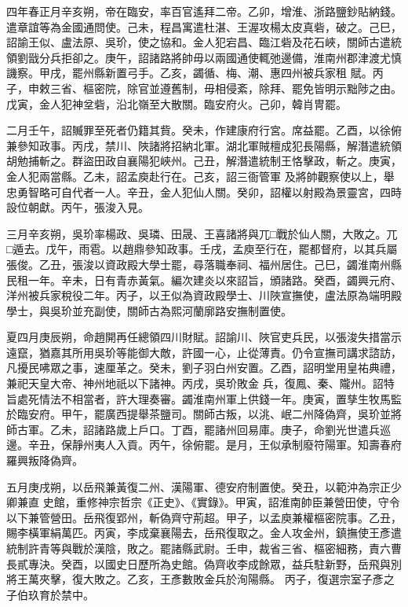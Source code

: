 \begin{pinyinscope}
 四年春正月辛亥朔，帝在臨安，率百官遙拜二帝。乙卯，增淮、浙路鹽鈔貼納錢。遣章誼等為金國通問使。己未，程昌寓遣杜湛、王渥攻楊太皮真砦，破之。己巳，詔諭王似、盧法原、吳玠，使之協和。金人犯宕昌、臨江砦及花石峽，關師古遣統領劉戩分兵拒卻之。庚午，詔諸路將帥毋以兩國通使輒弛邊備，淮南州郡津渡尤慎譏察。甲戌，罷州縣新置弓手。乙亥，蠲循、梅、潮、惠四州被兵家租
 賦。丙子，申敕三省、樞密院，除官並遵舊制，毋相侵紊，除拜、罷免皆明示黜陟之由。戊寅，金人犯神坌砦，沿北嶺至大散關。臨安府火。己卯，韓肖冑罷。



 二月壬午，詔贓罪至死者仍籍其貲。癸未，作建康府行宮。席益罷。乙酉，以徐俯兼參知政事。丙戌，禁川、陜諸將招納北軍。湖北軍賊檀成犯長陽縣，解潛遣統領胡勉捕斬之。群盜田政自襄陽犯峽州。己丑，解潛遣統制王恪擊政，斬之。庚寅，金人犯兩當縣。乙未，詔孟庾赴行在。己亥，詔三衙管軍
 及將帥觀察使以上，舉忠勇智略可自代者一人。辛丑，金人犯仙人關。癸卯，詔權以射殿為景靈宮，四時設位朝獻。丙午，張浚入見。



 三月辛亥朔，吳玠率楊政、吳璘、田晟、王喜諸將與兀□戰於仙人關，大敗之。兀□遁去。戊午，雨雹。以趙鼎參知政事。壬戌，孟庾至行在，罷都督府，以其兵屬張俊。乙丑，張浚以資政殿大學士罷，尋落職奉祠、福州居住。己巳，蠲淮南州縣民租一年。辛未，日有青赤黃氣。編次建炎以來詔旨，頒諸路。癸酉，蠲興元府、
 洋州被兵家稅役二年。丙子，以王似為資政殿學士、川陜宣撫使，盧法原為端明殿學士，與吳玠並充副使，關師古為熙河蘭廓路安撫制置使。



 夏四月庚辰朔，命趙開再任總領四川財賦。詔諭川、陜官吏兵民，以張浚失措當示遠竄，猶嘉其所用吳玠等能御大敵，許國一心，止從薄責。仍令宣撫司講求諮訪，凡擾民咈眾之事，速厘革之。癸未，劉子羽白州安置。乙酉，詔明堂用皇祐典禮，兼祀天皇大帝、神州地祇以下諸神。丙戌，吳玠敗金
 兵，復鳳、秦、隴州。詔特旨處死情法不相當者，許大理奏審。蠲淮南州軍上供錢一年。庚寅，置孳生牧馬監於臨安府。甲午，罷廣西提舉茶鹽司。關師古叛，以洮、岷二州降偽齊，吳玠並將師古軍。乙未，詔諸路歲上戶口。丁酉，罷諸州回易庫。庚子，命劉光世遣兵巡邊。辛丑，保靜州夷人入貢。丙午，徐俯罷。是月，王似承制廢符陽軍。知壽春府羅興叛降偽齊。



 五月庚戌朔，以岳飛兼黃復二州、漢陽軍、德安府制置使。癸丑，以範沖為宗正少卿兼直
 史館，重修神宗哲宗《正史》、《實錄》。甲寅，詔淮南帥臣兼營田使，守令以下兼管營田。岳飛復郢州，斬偽齊守荊超。甲子，以孟庾兼權樞密院事。乙丑，賜李橫軍絹萬匹。丙寅，李成棄襄陽去，岳飛復取之。金人攻金州，鎮撫使王彥遣統制許青等與戰於漢陰，敗之。罷諸縣武尉。壬申，裁省三省、樞密細務，責六曹長貳專決。癸酉，以國史日歷所為史館。偽齊收李成餘眾，益兵駐新野，岳飛與別將王萬夾擊，復大敗之。乙亥，王彥數敗金兵於洵陽縣。
 丙子，復選宗室子彥之子伯玖育於禁中。




\end{pinyinscope}
